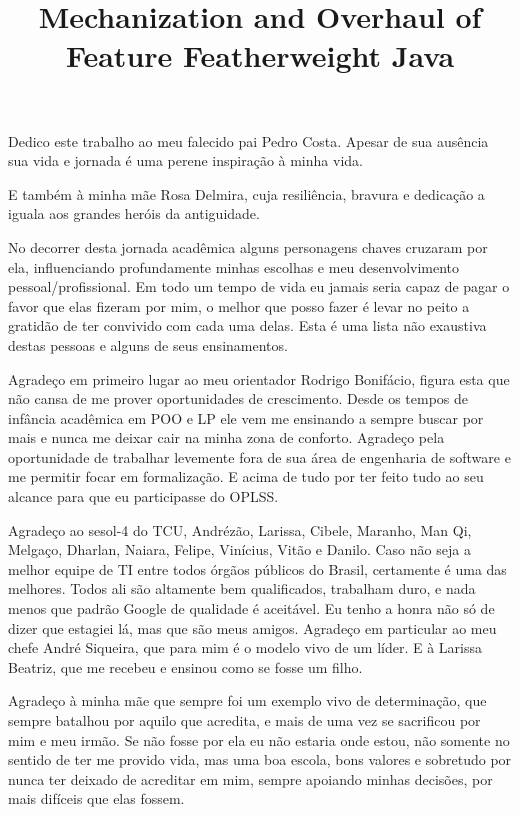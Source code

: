 \documentclass[bacharelado]{unb-cic}
\title{Mechanization and Overhaul of Feature Featherweight Java}
\theoremstyle{definition}
\theoremstyle{definition}
\begin{document}
  \maketitle
  \pretextual

  \begin{dedicatoria}
      Dedico este trabalho ao meu falecido pai Pedro Costa.
      Apesar de sua ausência sua vida e jornada é uma perene inspiração
      à minha vida.

      E também à minha mãe Rosa Delmira, cuja resiliência,
      bravura e dedicação a iguala aos grandes heróis da antiguidade.
  \end{dedicatoria}

  \begin{agradecimentos}
    No decorrer desta jornada acadêmica alguns personagens chaves cruzaram por ela,
    influenciando profundamente minhas escolhas e meu desenvolvimento pessoal/profissional. Em todo um tempo de vida eu jamais seria capaz de pagar o favor
    que elas fizeram por mim, o melhor que posso fazer é levar no peito a gratidão
    de ter convivido com cada uma delas. Esta é uma lista não exaustiva destas pessoas e alguns de seus ensinamentos.

    Agradeço em primeiro lugar ao meu orientador Rodrigo Bonifácio, figura esta que 
    não cansa de me prover oportunidades de crescimento. Desde os tempos de infância
    acadêmica em POO e LP ele vem me ensinando a sempre buscar por mais e nunca 
    me deixar cair na minha zona de conforto. Agradeço pela oportunidade de trabalhar
    levemente fora de sua área de engenharia de software e me permitir focar em formalização. E acima de tudo por ter feito tudo ao seu alcance para que eu participasse do OPLSS.

    Agradeço ao sesol-4 do TCU, Andrézão, Larissa, Cibele, Maranho, Man Qi, Melgaço,
    Dharlan, Naiara, Felipe, Vinícius, Vitão e Danilo.
    Caso não seja a melhor equipe de TI entre todos órgãos públicos do Brasil,
    certamente é uma das melhores. Todos ali são altamente bem qualificados,
    trabalham duro, e nada menos que padrão Google de qualidade é aceitável.
    Eu tenho a honra não só de dizer que estagiei lá, mas que são meus amigos.
    Agradeço em particular ao meu chefe André Siqueira, que para mim é o modelo vivo de um líder.
    E à Larissa Beatriz, que me recebeu e ensinou como se fosse um filho.

    Agradeço à minha mãe que sempre foi um exemplo vivo de determinação,
    que sempre batalhou por aquilo que acredita, e mais de uma vez se sacrificou
    por mim e meu irmão. Se não fosse por ela eu não estaria onde estou, não somente
    no sentido de ter me provido vida, mas uma boa escola, bons valores e sobretudo
    por nunca ter deixado de acreditar em mim, sempre apoiando minhas decisões, por
    mais difíceis que elas fossem.


\end{agradecimentos}
\end{document}
